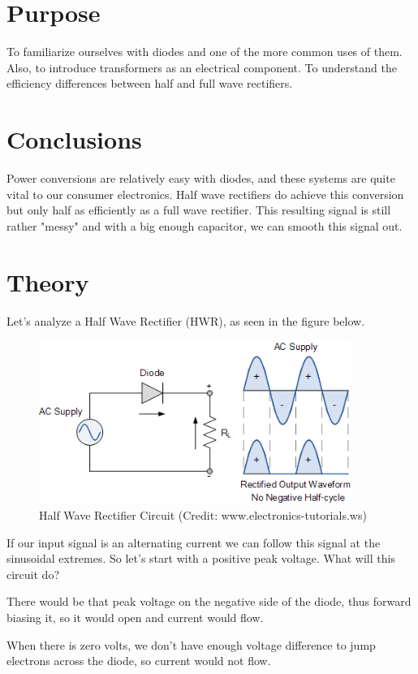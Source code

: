 \documentclass[prb,preprint]{revtex4-1}
\begin{document}
\section{Purpose}
To familiarize ourselves with diodes and one of the more common uses of them. Also, to introduce transformers as an electrical component. To understand the efficiency differences between half and full wave rectifiers.

\section{Conclusions}
Power conversions are relatively easy with diodes, and these systems are quite vital to our consumer electronics. Half wave rectifiers do achieve this conversion but only half as efficiently as a full wave rectifier. This resulting signal is still rather "messy" and with a big enough capacitor, we can smooth this signal out.

\section{Theory}
Let's analyze a Half Wave Rectifier (HWR), as seen in the figure below. 

\begin{figure}[ht]
\centering
\includegraphics[width=4in]{hwr.png}
\caption{Half Wave Rectifier Circuit (Credit: www.electronics-tutorials.ws)}
\label{fig1}
\end{figure}

If our input signal is an alternating current we can follow this signal at the sinusoidal extremes. So let's start with a positive peak voltage. What will this circuit do?

There would be that peak voltage on the negative side of the diode, thus forward biasing it, so it would open and current would flow.

When there is zero volts, we don't have enough voltage difference to jump electrons across the diode, so current would not flow.
\end{document}
